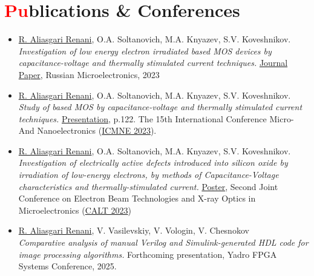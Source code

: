 \documentclass[a4paper, 11pt]{article}
\newcommand{\resumeSubHeadingListStart}{\begin{itemize}[leftmargin=0.0in, label={}]}
\newcommand{\resumeSubHeadingListEnd}{\end{itemize}}
\begin{document}
\section{{\textcolor{red}{Pu}blications} \& Conferences}
\resumeSubHeadingListStart
    \item \underline{R. Aliasgari Renani}, O.A. Soltanovich, M.A. Knyazev, S.V. Koveshnikov. \\ \textit{Investigation of low energy electron irradiated  based MOS devices by capacitance-voltage and thermally stimulated current techniques.} \href{https://doi.org/10.1134/S1063739723600516}{Journal Paper}, Russian Microelectronics, 2023
    \item \underline{R. Aliasgari Renani}, O.A. Soltanovich, M.A. Knyazev, S.V. Koveshnikov. \\ \textit{Study of  based MOS by capacitance-voltage and thermally stimulated current techniques.} \href{https://icmne.ftian.ru/wp-content/uploads/icmne-2023_e-version.pdf}{Presentation}, p.122. The 15th International Conference Micro- And Nanoelectronics (\href{https://icmne.ftian.ru}{ICMNE 2023}).
    \item \underline{R. Aliasgari Renani}, O.A. Soltanovich, M.A. Knyazev, S.V. Koveshnikov. \\ \textit{Investigation of electrically active defects introduced into silicon oxide by irradiation of low-energy electrons, by methods of Capacitance-Voltage characteristics and thermally-stimulated current.} \href{https://cebt23.iptm.ru/download/numbered/91.pdf}{Poster}, Second Joint Conference on Electron Beam Technologies and X-ray Optics in Microelectronics (\href{https://cebt23.iptm.ru}{CALT 2023})
    \item \underline{R. Aliasgari Renani}, V. Vasilevskiy, V. Vologin, V. Chesnokov \\ \textit{Comparative analysis of manual Verilog and Simulink-generated HDL code for image processing algorithms.} Forthcoming presentation, Yadro FPGA Systems Conference, 2025.
    
\resumeSubHeadingListEnd
\vspace{-20pt}

\end{document}
